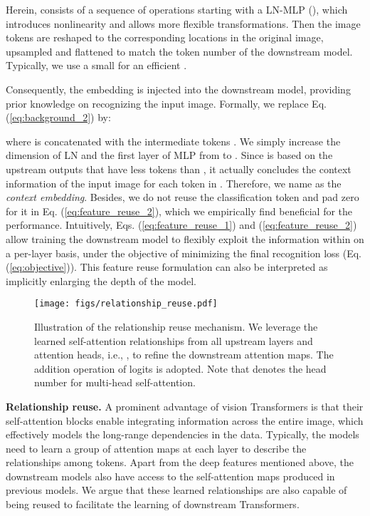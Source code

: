 \documentclass{article}
\begin{document}
Herein,  consists of a sequence of operations starting with a LN-MLP (), which introduces nonlinearity and allows more flexible transformations. Then the image tokens are reshaped to the corresponding locations in the original image, upsampled and flattened to match the token number of the downstream model. Typically, we use a small  for an efficient . 

Consequently, the embedding  is injected into the downstream model, providing prior knowledge on recognizing the input image. Formally, we replace Eq. (\ref{eq:background_2}) by:

where  is concatenated with the intermediate tokens . We simply increase the dimension of LN and the first layer of MLP from  to . Since  is based on the upstream outputs  that have less tokens than , it actually concludes the context information of the input image for each token in . Therefore, we name  as the \emph{context embedding}. Besides, we do not reuse the classification token and pad zero for it in Eq. (\ref{eq:feature_reuse_2}), which we empirically find beneficial for the performance. Intuitively, Eqs. (\ref{eq:feature_reuse_1}) and (\ref{eq:feature_reuse_2}) allow training the downstream model to flexibly exploit the information within  on a per-layer basis, under the objective of minimizing the final recognition loss (Eq. (\ref{eq:objective})). This feature reuse formulation can also be interpreted as implicitly enlarging the depth of the model.



\begin{wrapfigure}{r}{9cm}
\begin{minipage}[t]{\linewidth}
    \centering
    \texttt{[image: figs/relationship\_reuse.pdf]}	
    \vskip -0.05in
    \caption{
        Illustration of the relationship reuse mechanism. We leverage the learned self-attention relationships from all upstream layers and attention heads, i.e., , to refine the downstream attention maps. The addition operation of logits is adopted. Note that  denotes the head number for multi-head self-attention.
    \label{fig:relationship_reuse}}  
    \end{minipage}
    \vskip -0.25in
\end{wrapfigure}
\textbf{Relationship reuse.}
A prominent advantage of vision Transformers is that their self-attention blocks enable integrating information across the entire image, which effectively models the long-range dependencies in the data. Typically, the models need to learn a group of attention maps at each layer to describe the relationships among tokens. Apart from the deep features mentioned above, the downstream models also have access to the self-attention maps produced in previous models. We argue that these learned relationships are also capable of being reused to facilitate the learning of downstream Transformers.
\end{document}
